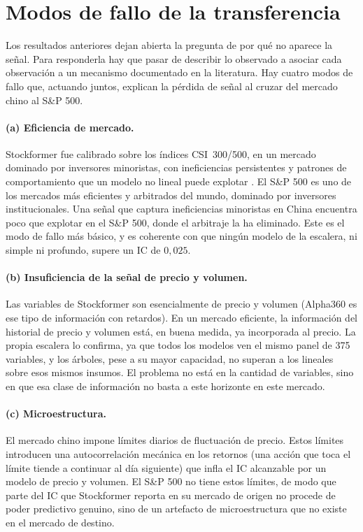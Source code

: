 \section{Modos de fallo de la transferencia}\label{sec:p1-fallo}

Los resultados anteriores dejan abierta la pregunta de por qué no aparece la señal. Para
responderla hay que pasar de describir lo observado a asociar cada observación a un
mecanismo documentado en la literatura. Hay cuatro modos de fallo que, actuando juntos,
explican la pérdida de señal al cruzar del mercado chino al S\&P 500.

\paragraph{(a) Eficiencia de mercado.} Stockformer fue calibrado sobre los índices
CSI~300/500, en un mercado dominado por inversores minoristas, con ineficiencias
persistentes y patrones de comportamiento que un modelo no lineal puede explotar
\autocite{liu2019size}. El S\&P 500 es uno de los mercados más eficientes y arbitrados del
mundo, dominado por inversores institucionales. Una señal que captura ineficiencias
minoristas en China encuentra poco que explotar en el S\&P 500, donde el arbitraje la ha
eliminado. Este es el modo de fallo más básico, y es coherente con que ningún modelo de la
escalera, ni simple ni profundo, supere un IC de $0{,}025$.

\paragraph{(b) Insuficiencia de la señal de precio y volumen.} Las variables de
Stockformer son esencialmente de precio y volumen (Alpha360 es ese tipo de información con
retardos). En un mercado eficiente, la información del historial de precio y volumen está,
en buena medida, ya incorporada al precio. La propia escalera lo confirma, ya que todos los
modelos ven el mismo panel de 375 variables, y los árboles, pese a su mayor capacidad, no
superan a los lineales sobre esos mismos insumos. El problema no está en la cantidad de
variables, sino en que esa clase de información no basta a este horizonte en este mercado.

\paragraph{(c) Microestructura.} El mercado chino impone límites diarios de fluctuación de
precio. Estos límites introducen una autocorrelación mecánica en los retornos (una acción
que toca el límite tiende a continuar al día siguiente) que infla el IC alcanzable por un
modelo de precio y volumen. El S\&P 500 no tiene estos límites, de modo que parte del IC
que Stockformer reporta en su mercado de origen no procede de poder predictivo genuino,
sino de un artefacto de microestructura que no existe en el mercado de destino.

